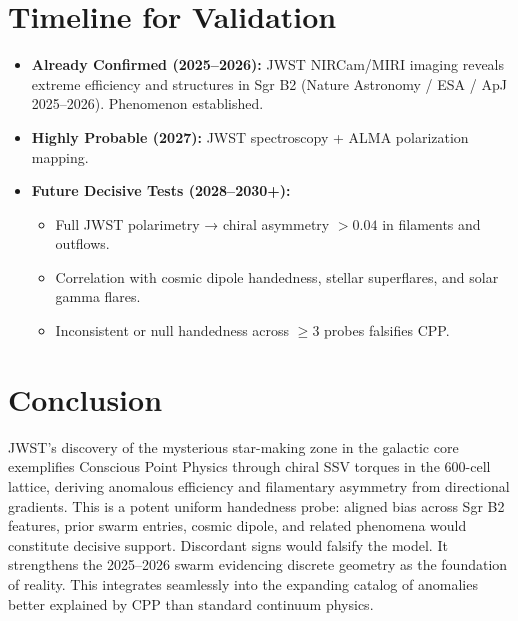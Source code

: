 \documentclass[11pt]{article}
\begin{document}
\section{Timeline for Validation}
\begin{itemize}
    \item \textbf{Already Confirmed (2025--2026):} JWST NIRCam/MIRI imaging reveals extreme efficiency and structures in Sgr B2 (Nature Astronomy / ESA / ApJ 2025--2026). Phenomenon established.
    \item \textbf{Highly Probable (2027):} JWST spectroscopy + ALMA polarization mapping.
    \item \textbf{Future Decisive Tests (2028--2030+):}
    \begin{itemize}
        \item Full JWST polarimetry → chiral asymmetry $>0.04$ in filaments and outflows.
        \item Correlation with cosmic dipole handedness, stellar superflares, and solar gamma flares.
        \item Inconsistent or null handedness across $\geq 3$ probes falsifies CPP.
    \end{itemize}
\end{itemize}

\section{Conclusion}
JWST's discovery of the mysterious star-making zone in the galactic core exemplifies Conscious Point Physics through chiral SSV torques in the 600-cell lattice, deriving anomalous efficiency and filamentary asymmetry from directional gradients.  
This is a potent uniform handedness probe: aligned bias across Sgr B2 features, prior swarm entries, cosmic dipole, and related phenomena would constitute decisive support. Discordant signs would falsify the model. It strengthens the 2025--2026 swarm evidencing discrete geometry as the foundation of reality.  
This integrates seamlessly into the expanding catalog of anomalies better explained by CPP than standard continuum physics.
\end{document}
